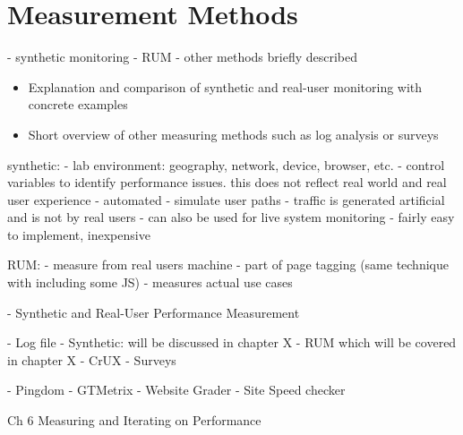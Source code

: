 \section{Measurement Methods}


- synthetic monitoring
- RUM
- other methods briefly described


\begin{itemize}
\item Explanation and comparison of synthetic and real-user monitoring with concrete examples
\item Short overview of other measuring methods such as log analysis or surveys
\end{itemize}








synthetic:
- lab environment: geography, network, device, browser, etc.
- control variables to identify performance issues. this does not reflect real world and real user experience
- automated
- simulate user paths
- traffic is generated artificial and is not by real users
 - can also be used for live system monitoring
 - fairly easy to implement, inexpensive

RUM:
- measure from real users machine
- part of page tagging (same technique with including some JS)
- measures actual use cases



- Synthetic and Real-User Performance Measurement



- Log file
- Synthetic: will be discussed in chapter X
- RUM which will be covered in chapter X
- CrUX
- Surveys


- Pingdom
- GTMetrix
- Website Grader
- Site Speed checker












Ch 6 Measuring and Iterating on Performance

